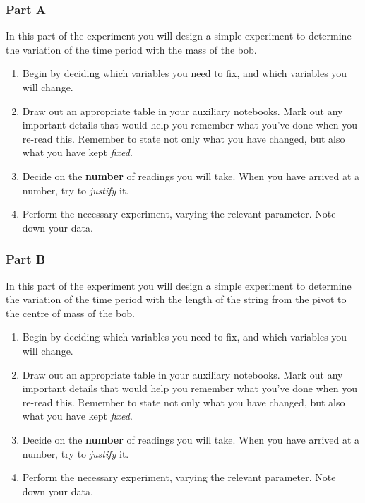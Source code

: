 \subsubsection{Part A}

In this part of the experiment you will design a simple experiment to determine the variation of the time period with the mass of the bob.

\begin{enumerate}
    \item Begin by deciding which variables you need to fix, and which variables you will change.
    
    \item Draw out an appropriate table in your auxiliary notebooks. Mark out any important details that would help you remember what you've done when you re-read this. Remember to state not only what you have changed, but also what you have kept \textit{fixed}.
    
    \item Decide on the \textbf{number} of readings you will take. When you have arrived at a number, try to \textit{justify} it.
    
    \item Perform the necessary experiment, varying the relevant parameter. Note down your data.
    
\end{enumerate}



\subsubsection{Part B}

In this part of the experiment you will design a simple experiment to determine the variation of the time period with the length of the string from the pivot to the centre of mass of the bob.

\begin{enumerate}
    \item Begin by deciding which variables you need to fix, and which variables you will change.
    
    \item Draw out an appropriate table in your auxiliary notebooks. Mark out any important details that would help you remember what you've done when you re-read this. Remember to state not only what you have changed, but also what you have kept \textit{fixed}.
    
    \item Decide on the \textbf{number} of readings you will take. When you have arrived at a number, try to \textit{justify} it.
    
    \item Perform the necessary experiment, varying the relevant parameter. Note down your data.
    
\end{enumerate}


